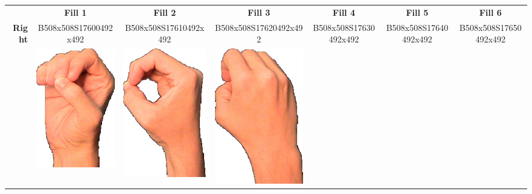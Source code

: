 \documentclass{article}
\begin{document}
\begin{center}
\begin{tabular}{r*{6}{c}}
&\textbf{Fill 1}&\textbf{Fill 2}&\textbf{Fill 3}&\textbf{Fill 4}&\textbf{Fill 5}&\textbf{Fill 6}\\
\multirow{2}{*}{\textbf{Right}}&
B508x508S17600492x492&
B508x508S17610492x492&
B508x508S17620492x492&
B508x508S17630492x492&
B508x508S17640492x492&
B508x508S17650492x492\\
&
\includegraphics[scale=0.1]{images/05-17-1.jpg}&
\includegraphics[scale=0.1]{images/05-17-2.jpg}&
\includegraphics[scale=0.1]{images/05-17-3.jpg}&

\end{tabular}
\end{center}
\end{document}
